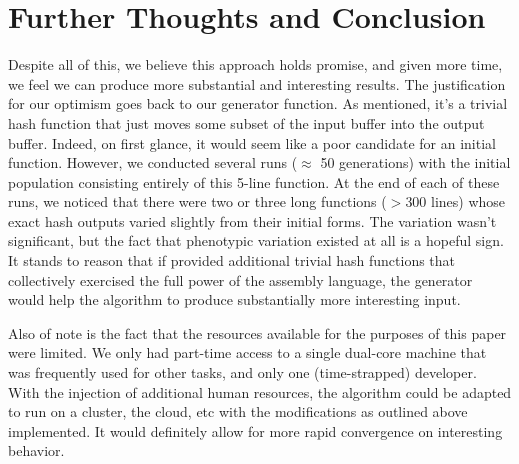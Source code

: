 \documentclass{article}
\begin{document}
\section{Further Thoughts and Conclusion}
Despite all of this, we believe this approach holds promise, and given more time, we feel we can produce more substantial and interesting results. The justification for our optimism goes back to our generator function. As mentioned, it's a trivial hash function that just moves some subset of the input buffer into the output buffer. Indeed, on first glance, it would seem like a poor candidate for an initial function. However, we conducted several runs ($\approx$ 50 generations) with the initial population consisting entirely of this 5-line function. At the end of each of these runs, we noticed that there were two or three long functions ($>$300 lines) whose exact hash outputs varied slightly from their initial forms. The variation wasn't significant, but the fact that phenotypic variation existed at all is a hopeful sign. It stands to reason that if provided additional trivial hash functions that collectively exercised the full power of the assembly language, the generator would help the algorithm to produce substantially more interesting input.

Also of note is the fact that the resources available for the purposes of this paper were limited. We only had part-time access to a single dual-core machine that was frequently used for other tasks, and only one (time-strapped) developer.  With the injection of additional human resources, the algorithm could be adapted to run on a cluster, the cloud, etc with the modifications as outlined above implemented. It would definitely allow for more rapid convergence on interesting behavior.

\end{document}
